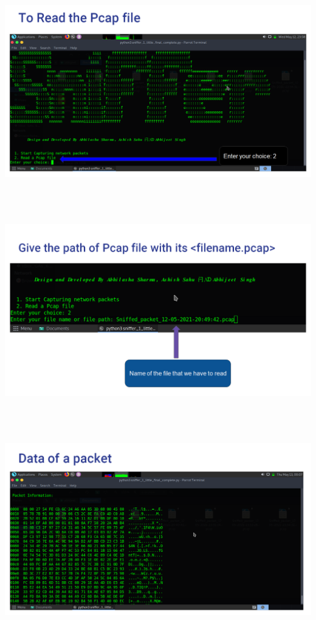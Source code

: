\documentclass[12pt, a4paper]{report}
\begin{document}
\includegraphics[width=6.85666in,height=3.55507in]{Screenshot (13).png}

\includegraphics[width=6.85666in,height=3.55507in]{Screenshot (14).png}

\includegraphics[width=6.85666in,height=3.55507in]{Screenshot (15).png}
\end{document}
